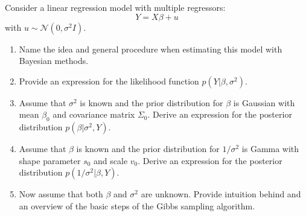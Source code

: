Consider a linear regression model with multiple regressors:
$$Y = X\beta + u$$ with $u \sim \mathcal{N}(0, \sigma^2 I)$.
\begin{enumerate}
    \item Name the idea and general procedure when estimating this model with Bayesian methods.
    \item Provide an expression for the likelihood function $p(Y|\beta,\sigma^2)$.
    \item Assume that $\sigma^2$ is known and the prior distribution for $\beta$ is Gaussian with mean $\beta_0$ and covariance matrix $\Sigma_0$. Derive an expression for the posterior distribution $p(\beta|\sigma^2,Y)$.
    \item Assume that $\beta$ is known and the prior distribution for $1/\sigma^2$ is Gamma with shape parameter $s_0$ and scale $v_0$. Derive an expression for the posterior distribution $p(1/\sigma^2|\beta,Y)$.
    \item Now assume that both $\beta$ and $\sigma^2$ are unknown. Provide intuition behind and an overview of the basic steps of the Gibbs sampling algorithm.
\end{enumerate}